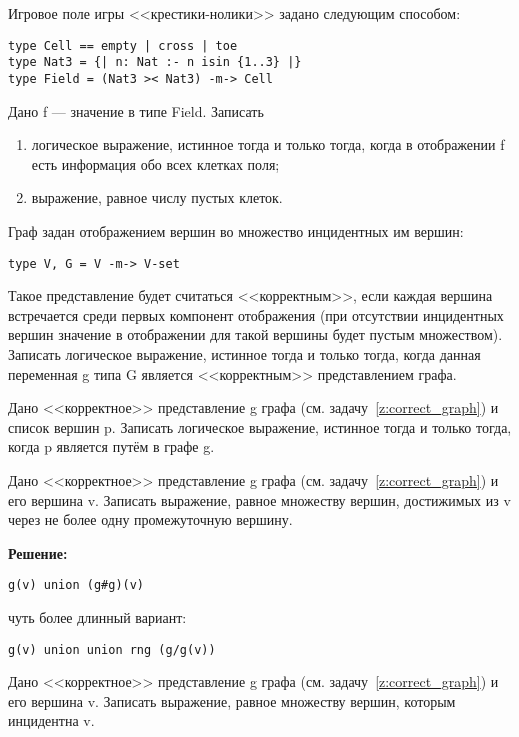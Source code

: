 \z Игровое поле игры <<крестики-нолики>> задано следующим способом:
\begin{lstlisting}
type Cell == empty | cross | toe
type Nat3 = {| n: Nat :- n isin {1..3} |}
type Field = (Nat3 >< Nat3) -m-> Cell
\end{lstlisting}
Дано f --- значение в типе Field. Записать
\begin{enumerate}
  \item логическое выражение, истинное тогда и только тогда, когда в отображении f есть информация обо всех клетках поля;
  \item выражение, равное числу пустых клеток.
\end{enumerate}

\z\label{z:correct_graph} Граф задан отображением вершин во множество инцидентных им вершин:
\begin{lstlisting}
type V, G = V -m-> V-set
\end{lstlisting}
Такое представление будет считаться <<корректным>>, если каждая вершина встречается среди первых компонент отображения (при отсутствии инцидентных вершин значение в отображении для такой вершины будет пустым множеством). Записать логическое выражение, истинное тогда и только тогда, когда данная переменная g типа G является <<корректным>> представлением графа.

\z Дано <<корректное>> представление g графа (см. задачу~\ref{z:correct_graph}) и список вершин p. Записать логическое выражение, истинное тогда и только тогда, когда p является путём в графе g.

\z Дано <<корректное>> представление g графа (см. задачу~\ref{z:correct_graph}) и его вершина v. Записать выражение, равное множеству вершин, достижимых из v через не более одну промежуточную вершину.

\textbf{Решение:}

\begin{lstlisting}
g(v) union (g#g)(v)
\end{lstlisting}

чуть более длинный вариант:
\begin{lstlisting}
g(v) union union rng (g/g(v))
\end{lstlisting}

\z Дано <<корректное>> представление g графа (см. задачу~\ref{z:correct_graph}) и его вершина v. Записать выражение, равное множеству вершин, которым инцидентна v.


